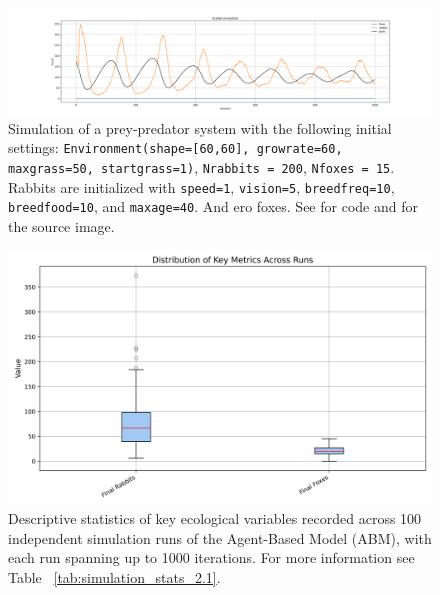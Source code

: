 \begin{figure}[!ht]
  \centering
  \includegraphics[width=0.9\linewidth]{images/Ecolab_simulation_no_foxes.png}
  \caption{Simulation of a prey-predator system with the following initial settings: \texttt{Environment(shape=[60,60], growrate=60, maxgrass=50, startgrass=1)}, \texttt{Nrabbits = 200}, \texttt{Nfoxes = 15}. Rabbits are initialized with \texttt{speed=1}, \texttt{vision=5}, \texttt{breedfreq=10}, \texttt{breedfood=10}, and \texttt{maxage=40}. And ero foxes. See \cite{youngaryantwo_initial_conditions_3d_separateICode} for code and \cite{youngaryantwo_initial_conditions_3d_3separateICode} for the source image.}
  \label{fig:Ecolab_pred_prey_no_foxes}
\end{figure}


\begin{figure}[!ht]
  \centering
  \includegraphics[width=0.9\linewidth]{images/boxplot_metrics_100_sim.png}
  \caption{
    Descriptive statistics of key ecological variables recorded across 100 independent simulation runs of the Agent-Based Model (ABM), with each run spanning up to 1000 iterations. For more information see Table ~\ref{tab:simulation_stats_2.1}.
}
  \label{fig:boxplot_metrics_100_sim}
\end{figure}